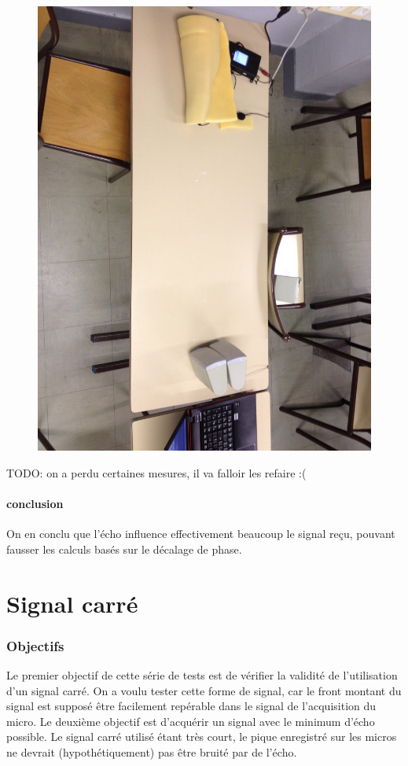 \documentclass[12pt,a4paper]{report}
\begin{document}
\begin{figure}[H]
\includegraphics[width=\textwidth]{../donnees25-02/IMG_0924.jpg} 
\end{figure}

TODO: on a perdu certaines mesures, il va falloir les refaire :(

\subsection{conclusion}
On en conclu que l'écho influence effectivement beaucoup le signal reçu, pouvant fausser les calculs basés sur le décalage de phase.

\part{Signal carré}
\section{Objectifs}
	Le premier objectif de cette série de tests est de vérifier la validité de l'utilisation d'un signal carré.
	On a voulu tester cette forme de signal, car le front montant du signal est supposé être facilement repérable dans le signal de l'acquisition du micro.
	Le deuxième objectif est d'acquérir un signal avec le minimum d'écho possible. Le signal carré utilisé étant très court, le pique enregistré sur les micros ne devrait (hypothétiquement) pas être bruité par de l'écho.
\end{document}
